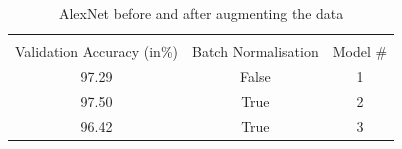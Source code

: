 \begin{table}[ht]
	\caption{AlexNet before and after augmenting the data}\label{batchnorm-table}
	\centering
	\begin{tabular}{ccc}
		\toprule
		\multicolumn{3}{c}{} \\
		Validation Accuracy (in\%)     & Batch Normalisation    &     Model  \# \\
		\midrule
		97.29    &    False    &    1\\
		97.50   &    True    &    2\\
		96.42    &    True    &    3 \\
		\bottomrule
	\end{tabular}
\end{table}





